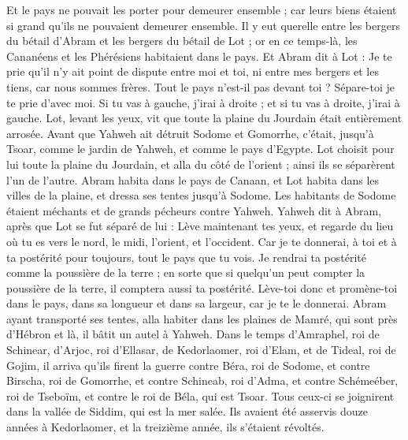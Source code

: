 \begin{multicols}{2}
Et le pays ne pouvait les porter pour demeurer ensemble ; car leurs biens étaient si grand qu'ils ne pouvaient demeurer ensemble.
Il y eut querelle entre les bergers du bétail d'Abram et les bergers du bétail de Lot ; or en ce temps-là, les Cananéens et les Phérésiens habitaient dans le pays.
Et Abram dit à Lot : Je te prie qu'il n'y ait point de dispute entre moi et toi, ni entre mes bergers et les tiens, car nous sommes frères.
Tout le pays n'est-il pas devant toi ? Sépare-toi je te prie d'avec moi. Si tu vas à gauche, j’irai à droite ; et si tu vas à droite, j’irai à gauche.
Lot, levant les yeux, vit que toute la plaine du Jourdain était entièrement arrosée. Avant que Yahweh ait détruit Sodome et Gomorrhe, c’était, jusqu'à Tsoar, comme le jardin de Yahweh, et comme le pays d'Egypte.
Lot choisit pour lui toute la plaine du Jourdain, et alla du côté de l’orient ; ainsi ils se séparèrent l'un de l'autre.
Abram habita dans le pays de Canaan, et Lot habita dans les villes de la plaine, et dressa ses tentes jusqu'à Sodome.
Les habitants de Sodome étaient méchants et de grands pécheurs contre Yahweh.
Yahweh dit à Abram, après que Lot se fut séparé de lui : Lève maintenant tes yeux, et regarde du lieu où tu es vers le nord, le midi, l'orient, et l'occident.
Car je te donnerai, à toi et à ta postérité pour toujours, tout le pays que tu vois.
Je rendrai ta postérité comme la poussière de la terre ; en sorte que si quelqu'un peut compter la poussière de la terre, il comptera aussi ta postérité.
Lève-toi donc et promène-toi dans le pays, dans sa longueur et dans sa largeur, car je te le donnerai.
Abram ayant transporté ses tentes, alla habiter dans les plaines de Mamré, qui sont près d’Hébron et là, il bâtit un autel à Yahweh.
\VerseOne{}Dans le temps d'Amraphel, roi de Schinear, d'Arjoc, roi d'Ellasar, de Kedorlaomer, roi d'Elam, et de Tideal, roi de Gojim,
il arriva qu’ils firent la guerre contre Béra, roi de Sodome, et contre Birscha, roi de Gomorrhe, et contre Schineab, roi d'Adma, et contre Schémeéber, roi de Tseboïm, et contre le roi de Béla, qui est Tsoar.
Tous ceux-ci se joignirent dans la vallée de Siddim, qui est la mer salée.
Ils avaient été asservis douze années à Kedorlaomer, et la treizième année, ils s'étaient révoltés.

\end{multicols}
